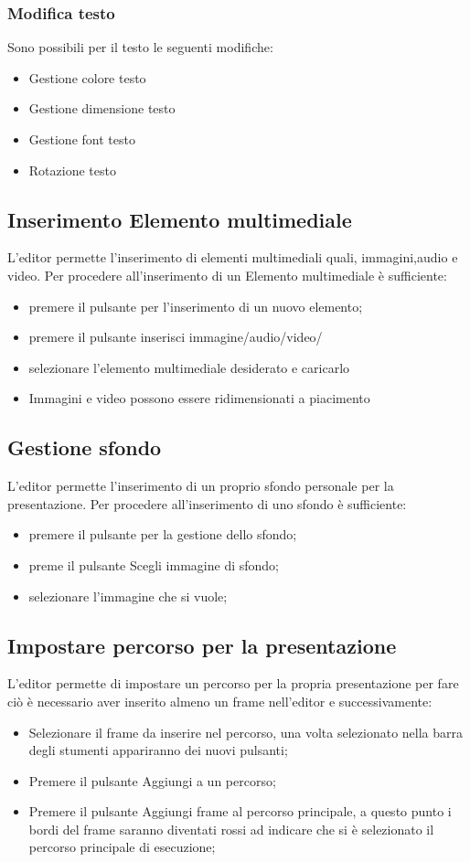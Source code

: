 \subsubsection{Modifica testo}
Sono possibili per il testo le seguenti modifiche:
\begin{itemize}
\item Gestione colore testo
\item Gestione dimensione testo
\item Gestione font testo
\item Rotazione testo
\end{itemize}
\subsection{Inserimento Elemento multimediale}
L'editor permette l'inserimento di elementi multimediali quali, immagini,audio e video. Per procedere all'inserimento di un Elemento multimediale è sufficiente:
\begin{itemize}
\item premere il pulsante per l'inserimento di un nuovo elemento;
\item premere il pulsante inserisci immagine/audio/video/
\item selezionare l'elemento multimediale desiderato e caricarlo
\item Immagini e video possono essere ridimensionati a piacimento 
\end{itemize}
\subsection{Gestione sfondo}
L'editor permette l'inserimento di un proprio sfondo personale per la presentazione. Per procedere all'inserimento di uno sfondo è sufficiente:
\begin{itemize}
\item premere il pulsante per la gestione dello sfondo;
\item preme il pulsante Scegli immagine di sfondo;
\item selezionare l'immagine che si vuole;
\end{itemize}
\subsection{Impostare percorso per la presentazione}
L'editor permette di impostare un percorso per la propria presentazione per fare ciò è necessario aver inserito almeno un frame nell'editor e successivamente:
\begin{itemize}
\item Selezionare il frame da inserire nel percorso, una volta selezionato nella barra degli stumenti appariranno dei nuovi pulsanti;
\item Premere il pulsante Aggiungi a un percorso;
\item Premere il pulsante Aggiungi frame al percorso principale, a questo punto i bordi del frame saranno diventati rossi ad indicare che si è selezionato il percorso principale di esecuzione;
\end{itemize}
